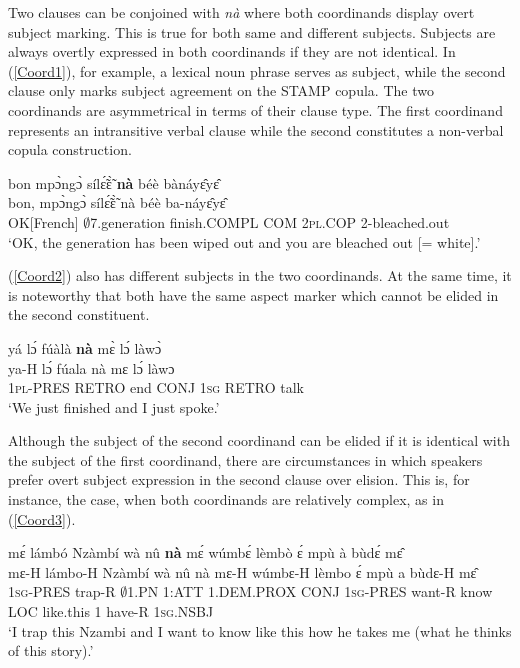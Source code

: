 Two clauses can be conjoined with {\itshape nà} where both coordinands display overt subject marking. This is true for both same and different subjects. 
Subjects are always overtly expressed in both coordinands if they are not identical. In (\ref{Coord1}), for example, a lexical noun phrase serves as subject, while the second clause only marks subject agreement on the STAMP copula. The two coordinands are asymmetrical in terms of their clause type.  The first coordinand represents an intransitive verbal clause while the second constitutes a non-verbal copula construction.

\begin{exe} 
\ex\label{Coord1}
  \glll bon mpɔ̀ngɔ̀ sílɛ̃́ɛ̃̀ {\bfseries nà} béè bànáyɛ̂yɛ̂  \\
        bon, mpɔ̀ngɔ̀ sílɛ̃́ɛ̃̀ nà béè ba-náyɛ̂yɛ̂  \\
      OK[French] $\emptyset$7.generation finish.COMPL COM 2\textsc{pl}.COP 2-bleached.out  \\
    \trans `OK, the generation has been wiped out and you are bleached out [= white].'
\end{exe}

(\ref{Coord2}) also has different subjects in the two coordinands.  At the same time, it is noteworthy that both have the same aspect marker which cannot be elided in the second constituent.

\begin{exe} 
\ex\label{Coord2}
  \glll     yá lɔ́ fúàlà {\bfseries nà} mɛ̀ lɔ́ làwɔ̀ \\
           ya-H lɔ́ fúala nà mɛ lɔ́ làwɔ \\
              1\textsc{pl}-PRES RETRO end CONJ 1\textsc{sg} RETRO talk \\
    \trans `We just finished and I just spoke.'
\end{exe}


Although the subject of the second coordinand can be elided if it is identical with the subject of the first coordinand,  there are circumstances in which speakers prefer overt subject expression in the second clause over elision. This is, for instance, the case, when both coordinands are relatively complex, as in (\ref{Coord3}). 

\begin{exe} 
\ex\label{Coord3}
  \glll mɛ́ lámbó Nzàmbí wà nû {\bfseries nà} mɛ́ wúmbɛ́ lèmbò ɛ́ mpù à bùdɛ́ mɛ̂  \\
       mɛ-H lámbo-H Nzàmbí wà nû nà mɛ-H wúmbɛ-H lèmbo ɛ́ mpù a bùdɛ-H mɛ̂  \\
        1\textsc{sg}-PRES trap-R $\emptyset$1.PN 1:ATT 1.DEM.PROX CONJ 1\textsc{sg}-PRES want-R know LOC like.this 1 have-R 1\textsc{sg}.NSBJ  \\
    \trans `I trap this Nzambi and I want to know like this how he takes me (what he thinks of this story).'
\end{exe}

